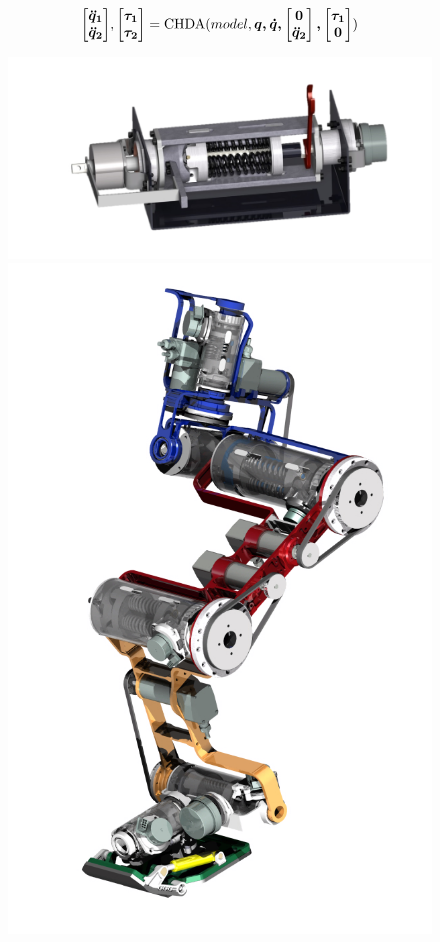 \documentclass[10pt]{beamer}
\begin{document}
\begin{frame}[allowframebreaks]
	\begin{equation}
	\boldsymbol{\begin{bmatrix} \ddot{q}_1 \\ \ddot{q}_2	\end{bmatrix}}, \boldsymbol{\begin{bmatrix} \tau_1 \\ \tau_2	\end{bmatrix}} = \mathrm{CHDA}(model,\boldsymbol{q,\dot{q},\begin{bmatrix} 0 \\ \ddot{q}_2	\end{bmatrix},\begin{bmatrix} \tau_1 \\ 0	\end{bmatrix}})
	\end{equation}
	
	\framebreak
	
	\begin{figure}[H]
	\includegraphics[width=.55\textwidth]{figs/actionneurRaideurVariable}
	\includegraphics[width=.45\textwidth]{figs/jambeFlexibleRaideurVariable}
	\end{figure}
	
\end{frame}


\end{document}
